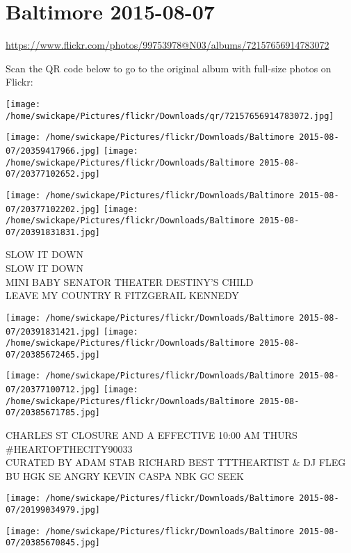 \documentclass[10pt,letterpaper]{article}
\title{}
\author{}
\date{}
\begin{document}
\section*{Baltimore 2015-08-07}

\url{https://www.flickr.com/photos/99753978@N03/albums/72157656914783072}

Scan the QR code below to go to the original album with full-size photos on Flickr:

\texttt{[image: /home/swickape/Pictures/flickr/Downloads/qr/72157656914783072.jpg]}
\pagebreak

\texttt{[image: /home/swickape/Pictures/flickr/Downloads/Baltimore 2015-08-07/20359417966.jpg]}
\texttt{[image: /home/swickape/Pictures/flickr/Downloads/Baltimore 2015-08-07/20377102652.jpg]}

\texttt{[image: /home/swickape/Pictures/flickr/Downloads/Baltimore 2015-08-07/20377102202.jpg]}
\texttt{[image: /home/swickape/Pictures/flickr/Downloads/Baltimore 2015-08-07/20391831831.jpg]}

SLOW IT DOWN\\
SLOW IT DOWN\\
MINI BABY SENATOR THEATER DESTINY'S CHILD\\
LEAVE MY COUNTRY R FITZGERAIL KENNEDY
\pagebreak

\texttt{[image: /home/swickape/Pictures/flickr/Downloads/Baltimore 2015-08-07/20391831421.jpg]}
\texttt{[image: /home/swickape/Pictures/flickr/Downloads/Baltimore 2015-08-07/20385672465.jpg]}

\texttt{[image: /home/swickape/Pictures/flickr/Downloads/Baltimore 2015-08-07/20377100712.jpg]}
\texttt{[image: /home/swickape/Pictures/flickr/Downloads/Baltimore 2015-08-07/20385671785.jpg]}

CHARLES ST CLOSURE AND A EFFECTIVE 10:00 AM THURS\\
\#HEARTOFTHECITY90033\\
CURATED BY ADAM STAB RICHARD BEST TTTHEARTIST \& DJ FLEG\\
BU HGK SE ANGRY KEVIN CASPA NBK GC SEEK
\pagebreak

\texttt{[image: /home/swickape/Pictures/flickr/Downloads/Baltimore 2015-08-07/20199034979.jpg]}

\vspace{0.25in}
\texttt{[image: /home/swickape/Pictures/flickr/Downloads/Baltimore 2015-08-07/20385670845.jpg]}
\end{document}
